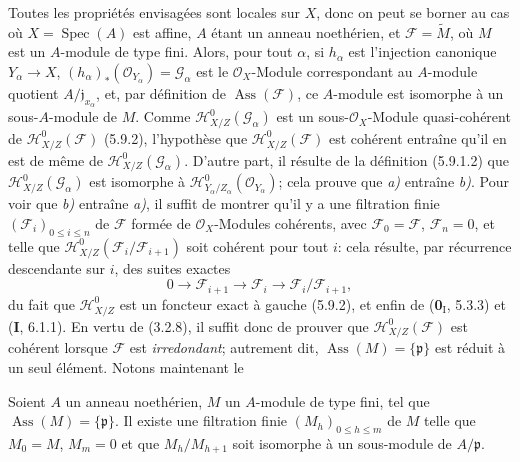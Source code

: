 Toutes les propriétés envisagées sont locales sur $X$, donc on peut se borner
au cas où $X=\operatorname{Spec}(A)$ est affine, $A$ étant un anneau
noethérien, et $\mathcal F=\widetilde M$, où $M$ est un $A$-module de type
fini. Alors, pour tout $\alpha$, si $h_\alpha$ est l'injection canonique
$Y_\alpha\to X$, $(h_\alpha)_*(\mathcal O_{Y_\alpha})=\mathcal G_\alpha$ est
le $\mathcal O_X$-Module correspondant au $A$-module quotient
$A/\mathfrak j_{x_\alpha}$, et, par définition de
$\operatorname{Ass}(\mathcal F)$, ce $A$-module est isomorphe à un
sous-$A$-module de $M$. Comme $\mathcal H^0_{X/Z}(\mathcal G_\alpha)$ est un
sous-$\mathcal O_X$-Module quasi-cohérent de
$\mathcal H^0_{X/Z}(\mathcal F)$ (5.9.2), l'hypothèse que
$\mathcal H^0_{X/Z}(\mathcal F)$ est cohérent entraîne qu'il en est de même de
$\mathcal H^0_{X/Z}(\mathcal G_\alpha)$. D'autre part, il résulte de la
définition (5.9.1.2) que $\mathcal H^0_{X/Z}(\mathcal G_\alpha)$ est
isomorphe à
$\mathcal H^0_{Y_\alpha/Z_\alpha}(\mathcal O_{Y_\alpha})$;
cela prouve que \emph{a)} entraîne \emph{b)}. Pour voir que \emph{b)} entraîne \emph{a)}, il suffit de
montrer qu'il y a une filtration finie $(\mathcal F_i)_{0\leq i\leq n}$ de
$\mathcal F$ formée de $\mathcal O_X$-Modules cohérents, avec
$\mathcal F_0=\mathcal F$, $\mathcal F_n=0$, et telle que
$\mathcal H^0_{X/Z}(\mathcal F_i/\mathcal F_{i+1})$ soit cohérent pour tout
$i$: cela résulte, par récurrence descendante sur $i$, des suites exactes
\[
0\longrightarrow\mathcal F_{i+1}\longrightarrow\mathcal F_i
\longrightarrow\mathcal F_i/\mathcal F_{i+1},
\]
du fait que $\mathcal H^0_{X/Z}$ est un foncteur exact à gauche (5.9.2), et
enfin de (\textbf{0}$_\mathrm I$, 5.3.3) et (\textbf{I}, 6.1.1). En vertu de (3.2.8), il suffit
donc de prouver que $\mathcal H^0_{X/Z}(\mathcal F)$ est cohérent lorsque
$\mathcal F$ est \emph{irredondant}; autrement dit,
$\operatorname{Ass}(M)=\{\mathfrak p\}$ est réduit à un seul élément. Notons
maintenant le

\begin{lemma}[5.11.1.1]
\label{IV.2.s5.11.1.1-fr}
Soient $A$ un anneau noethérien, $M$ un $A$-module de type fini, tel que
$\operatorname{Ass}(M)=\{\mathfrak p\}$. Il existe une filtration finie
$(M_h)_{0\leq h\leq m}$ de $M$ telle que $M_0=M$, $M_m=0$ et que
$M_h/M_{h+1}$ soit isomorphe à un sous-module de $A/\mathfrak p$.
\end{lemma}

